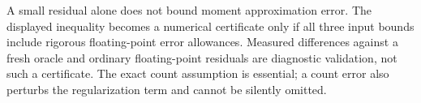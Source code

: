 \documentclass[11pt,a4paper]{article}
\begin{document}
A small residual alone does not bound moment approximation error. The
displayed inequality becomes a numerical certificate only if all three
input bounds include rigorous floating-point error allowances. Measured
differences against a fresh oracle and ordinary floating-point residuals
are diagnostic validation, not such a certificate. The exact count
assumption is essential; a count error also perturbs the regularization
term and cannot be silently omitted.
\end{document}
